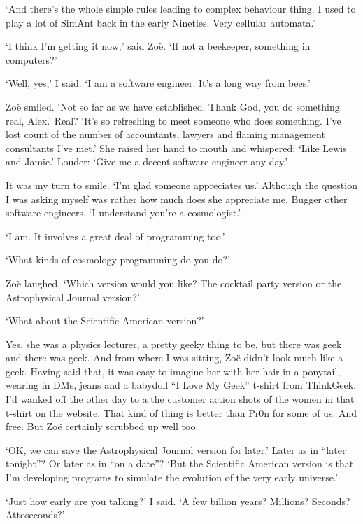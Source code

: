 `And there's the whole simple rules leading to complex behaviour thing. I used to play a lot of {\twelvesl SimAnt\/} back in the early Nineties. Very cellular automata.'

`I think I'm getting it now,' said Zoë. `If not a beekeeper, something in computers?'

`Well, yes,' I said. `I am a software engineer. It's a long way from bees.'

Zoë smiled. `Not so far as we have established. Thank God, you do something real, Alex.' Real? `It's so
refreshing to meet someone who does something. I've lost count of the
number of accountants, lawyers and flaming management consultants I've
met.' She raised her hand to mouth and whispered: `Like Lewis
and Jamie.' Louder: `Give me a decent software engineer any day.'

It was my turn to smile. `I'm glad someone appreciates us.'
Although the question I was asking myself was rather how much does
she appreciate {\twelveit me}. Bugger other software engineers. `I
understand you're a cosmologist.'

`I am. It involves a great deal of programming too.'

`What kinds of cosmology programming do you do?'

Zoë laughed. `Which version would you like? The cocktail party
version or the {\twelvesl Astrophysical Journal\/} version?'

`What about the {\twelvesl Scientific American\/} version?'

Yes, she was a physics lecturer, a pretty geeky thing to be, but
there was geek and there was geek. And from where I was sitting,
Zoë didn't look much like a geek. Having said that, it was easy
to imagine her with her hair in a ponytail, wearing in DMs, jeans and a
babydoll ``I Love My Geek'' t-shirt from ThinkGeek. I'd wanked off the other day to a
the customer action shots of the women in that t-shirt on the website.
That kind of thing is better than Pr0n for some of us. And free. But
Zoë certainly scrubbed up well too.

`OK, we can save the {\twelvesl Astrophysical Journal\/} version for
later.' Later as in ``later tonight''? Or later as in ``on a date''?
`But the {\twelvesl Scientific American\/} version is that I'm
developing programs to simulate the evolution of the very early
universe.'

`Just how early are you talking?' I said. `A few billion years?
Millions? Seconds? Attoseconds?'

